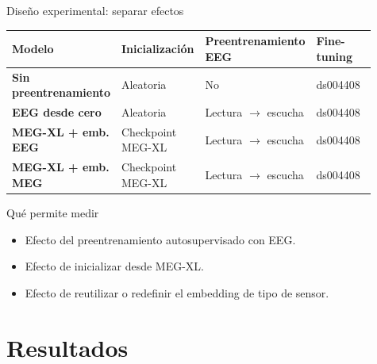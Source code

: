 \documentclass[aspectratio=169,10pt]{beamer}
\begin{document}
\begin{frame}[c]{Diseño experimental: separar efectos}
  \small
  \renewcommand{\arraystretch}{1.22}
  \setlength{\tabcolsep}{5pt}
  \begin{center}
  \begin{tabular}{>{\bfseries}p{0.25\linewidth}p{0.22\linewidth}p{0.26\linewidth}p{0.18\linewidth}}
    \toprule
    Modelo & Inicialización & Preentrenamiento EEG & Fine-tuning \\
    \midrule
    Sin preentrenamiento & Aleatoria & No & ds004408 \\
    EEG desde cero & Aleatoria & Lectura $\rightarrow$ escucha & ds004408 \\
    MEG-XL + emb. EEG & Checkpoint MEG-XL & Lectura $\rightarrow$ escucha & ds004408 \\
    MEG-XL + emb. MEG & Checkpoint MEG-XL & Lectura $\rightarrow$ escucha & ds004408 \\
    \bottomrule
  \end{tabular}
  \end{center}

  \vspace{3mm}

  \begin{block}{Qué permite medir}
    \begin{itemize}
      \item Efecto del preentrenamiento autosupervisado con EEG.
      \item Efecto de inicializar desde MEG-XL.
      \item Efecto de reutilizar o redefinir el embedding de tipo de sensor.
    \end{itemize}
  \end{block}

\end{frame}

\section{Resultados}
\end{document}
